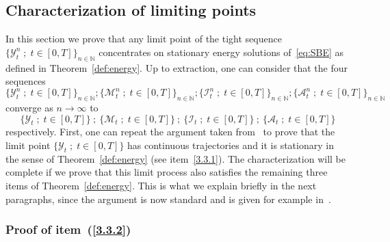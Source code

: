 \documentclass[AHL,Unicode,longabstracts]{cedram}
\begin{document}
\subsection{Characterization of limiting points}\label{sec:charact}

In this section we prove that any limit point of the tight sequence $\{{\mathcal Y}_t^n\; ; \; t \in [0,T]\}_{n\in\mathbb{N}}$ concentrates on stationary energy solutions of~\eqref{eq:SBE} as defined in Theorem~\ref{def:energy}. Up to extraction, one can consider that the four sequences
\[
\{{\mathcal Y}_t^n\; ; \; t \in [0,T]\}_{n\in\mathbb{N}};\{{\mathcal M}_t^n\; ; \; t \in [0,T]\}_{n\in\mathbb{N}} ; \{{\mathcal I}_t^n\; ; \; t \in [0,T]\}_{n\in\mathbb{N}}; \{{{\mathcal A}_t^n}\; ; \; t \in [0,T]\}_{n\in\mathbb{N}}
\]
converge as $n \to \infty$ to
\[
\{{\mathcal Y}_t\; ; \; t \in [0,T]\}\ ;\ \{{\mathcal M}_t\; ; \; t \in [0,T]\}\ ;\ \{{\mathcal I}_t\; ; \; t \in [0,T]\}\ ;\ \{{{\mathcal A}_t}\; ; \; t \in [0,T]\}
\]
respectively. First, one can repeat the argument taken from~\cite[Section~5.3]{gj2014} to prove that the limit point $\{{\mathcal Y}_t\; ; \; t \in [0,T]\}$ has continuous trajectories and it is stationary in the sense of Theorem~\ref{def:energy} (see item~\eqref{3.3.1}). The characterization will be complete if we prove that this limit process also satisfies the remaining three items of Theorem~\ref{def:energy}. This is what we explain briefly in the next paragraphs, since the argument is now standard and is given for example in~\cite{fgsimon2015,gj2014,GJS}.

\subsubsection{Proof of item~(\ref{3.3.2})}
\end{document}
